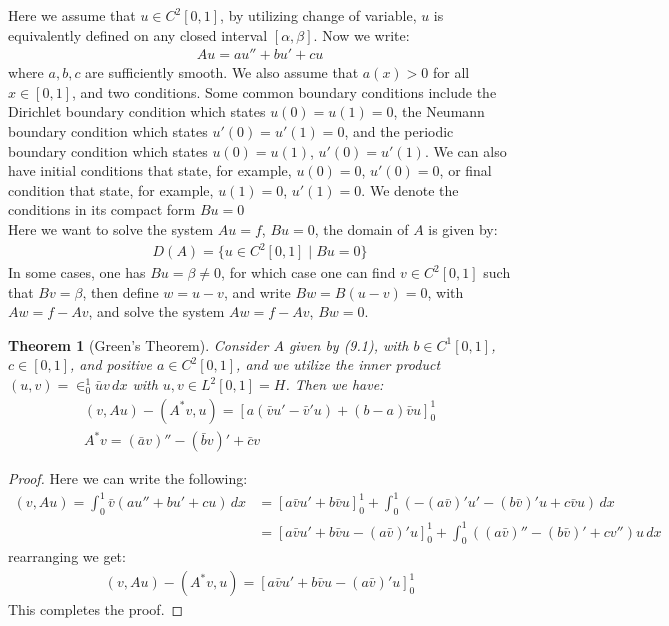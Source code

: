 \documentclass[11pt]{book}
\theoremstyle{break}
\theoremstyle{break}
\newtheorem{thm}{Theorem}[section]
\begin{document}
Here we assume that $u \in C^2[0,1]$, by utilizing change of variable, $u$ is equivalently defined on any closed interval $[\alpha,\beta]$. Now we write:
\begin{align}
Au = au'' + bu' +cu
\end{align}
where $a,b,c$ are sufficiently smooth. We also assume that $a(x) >0$ for all $x \in [0,1]$, and two conditions. Some common boundary conditions include the Dirichlet boundary condition which states $u(0) = u(1) = 0$, the Neumann boundary condition which states $u'(0) = u'(1) = 0$, and the periodic boundary condition which states $u(0) = u(1)$, $u'(0) = u'(1)$. We can also have initial conditions that state, for example, $u(0) = 0$, $u'(0) = 0$, or final condition that state, for example, $u(1) = 0$, $u'(1)= 0$. We denote the conditions in its compact form $Bu = 0$\\

Here we want to solve the system $Au = f$, $Bu = 0$, the domain of $A$ is given by:
\begin{align*}
D(A) = \{ u \in C^2[0,1] \mid Bu = 0\}
\end{align*}
In some cases, one has $Bu = \beta \neq 0$, for which case one can find $v \in C^2[0,1]$ such that $Bv = \beta$, then define $w = u-v$, and write $Bw = B(u-v) = 0$, with $Aw = f-Av$, and solve the system $Aw = f-Av$, $Bw = 0$. 

\begin{thm}[Green's Theorem]
Consider $A$ given by (9.1), with $b \in C^1[0,1]$, $c\in [0,1]$, and positive $a \in C^2[0,1]$, and we utilize the inner product $(u,v) = \in_0^1 \bar{u}v\, dx$ with $u,v \in L^2[0,1] = H$. Then we have:
\begin{align}
(v,Au) - (A^*v, u) = \left[a(\bar{v}u' - \bar{v}'u)+(b-a)\bar{v}u \right]_0^1 \\
A^*v = (\bar{a}v)'' - (\bar{b}v)' + \bar{c}v
\end{align}
\end{thm}
\begin{proof}
Here we can write the following:
\begin{align*}
(v,Au) = \int_0^1 \bar{v}(au'' + bu' +cu) \, dx &= [a\bar{v}u'+b\bar{v}u]_0^1 + \int_0^1 \left(-(a\bar{v})'u' - (b\bar{v})'u + c\bar{v}u\right)\, dx\\
&=[a\bar{v}u'+ b\bar{v}u - (a\bar{v})' u]_0^1 + \int_0^1 \left((a\bar{v})'' - (b\bar{v})' +cv''\right)u\, dx
\end{align*}
rearranging we get:
\begin{align*}
(v,Au) - (A^* v, u) = [a\bar{v}u'+ b\bar{v}u - (a\bar{v})' u]_0^1 
\end{align*}
This completes the proof.
\end{proof}
\end{document}
